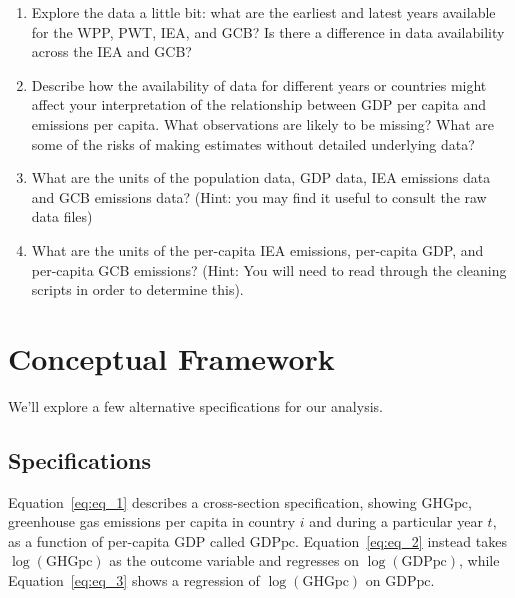 \begin{enumerate}
Once you've run this, the clean data should appear in your \verb+data/03_clean+ folder.\footnote{The script \texttt{01\_download\_datasets\_in\_use.R} provides example code for downloading the data from R rather than manually clicking to the websites. It's good practice for replicability to have the data download process also be part of your code if your data are public. Since the IEA data requires a login in order to download and it's not strictly necessary to have R do the downloading for you, we'll skip that part.}
\item Explore the data a little bit: what are the earliest and latest years available for the WPP, PWT, IEA, and GCB? Is there a difference in data availability across the IEA and GCB? 
\item Describe how the availability of data for different years or countries might affect your interpretation of the relationship between GDP per capita and emissions per capita. What observations are likely to be missing? What are some of the risks of making estimates without detailed underlying data?
\item What are the units of the population data, GDP data, IEA emissions data and GCB emissions data? (Hint: you may find it useful to consult the raw data files)
\item What are the units of the per-capita IEA emissions, per-capita GDP, and per-capita GCB emissions? (Hint: You will need to read through the cleaning scripts in order to determine this).
\end{enumerate}

\section{Conceptual Framework}

We'll explore a few alternative specifications for our analysis.

\subsection{Specifications}\label{sec:specifications}
Equation~\ref{eq:eq_1} describes a cross-section specification, showing $\text{GHGpc}$, greenhouse gas emissions per capita in country $i$ and during a particular year $t$, as a function of per-capita GDP called $\text{GDPpc}$. Equation~\ref{eq:eq_2} instead takes $\log(\text{GHGpc})$ as the outcome variable and regresses on  $\log(\text{GDPpc})$, while Equation~\ref{eq:eq_3} shows a regression of $\log(\text{GHGpc})$ on $\text{GDPpc}$.

